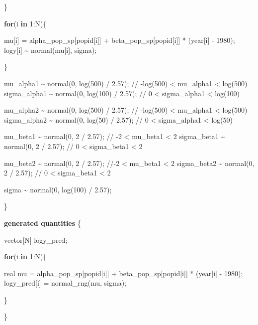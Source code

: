 \documentclass[
  letterpaper,
  DIV=11,
  numbers=noendperiod]{scrartcl}
\newenvironment{Shaded}{\begin{snugshade}}{\end{snugshade}}
\newcommand{\CommentTok}[1]{\textcolor[rgb]{0.37,0.37,0.37}{#1}}
\newcommand{\ControlFlowTok}[1]{\textcolor[rgb]{0.00,0.23,0.31}{\textbf{#1}}}
\newcommand{\DataTypeTok}[1]{\textcolor[rgb]{0.68,0.00,0.00}{#1}}
\newcommand{\DecValTok}[1]{\textcolor[rgb]{0.68,0.00,0.00}{#1}}
\newcommand{\FloatTok}[1]{\textcolor[rgb]{0.68,0.00,0.00}{#1}}
\newcommand{\KeywordTok}[1]{\textcolor[rgb]{0.00,0.23,0.31}{\textbf{#1}}}
\newcommand{\NormalTok}[1]{\textcolor[rgb]{0.00,0.23,0.31}{#1}}
\begin{document}
\begin{Shaded}
\begin{Highlighting}[]
\NormalTok{  \}}
  
  \ControlFlowTok{for}\NormalTok{(i }\ControlFlowTok{in} \DecValTok{1}\NormalTok{:N)\{}
    
\NormalTok{    mu[i] = alpha\_pop\_sp[popid[i]] + beta\_pop\_sp[popid[i]] * (year[i] {-} }\DecValTok{1980}\NormalTok{);}
\NormalTok{    logy[i] \textasciitilde{} normal(mu[i], sigma);}
    
\NormalTok{  \}}
  
\NormalTok{  mu\_alpha1 \textasciitilde{} normal(}\DecValTok{0}\NormalTok{, log(}\DecValTok{500}\NormalTok{) / }\FloatTok{2.57}\NormalTok{); }\CommentTok{// {-}log(500) \textless{} mu\_alpha1 \textless{} log(500)}
\NormalTok{  sigma\_alpha1 \textasciitilde{} normal(}\DecValTok{0}\NormalTok{, log(}\DecValTok{100}\NormalTok{) / }\FloatTok{2.57}\NormalTok{); }\CommentTok{// 0 \textless{} sigma\_alpha1 \textless{} log(100)}
  
\NormalTok{  mu\_alpha2 \textasciitilde{} normal(}\DecValTok{0}\NormalTok{, log(}\DecValTok{500}\NormalTok{) / }\FloatTok{2.57}\NormalTok{); }\CommentTok{// {-}log(500) \textless{} mu\_alpha1 \textless{} log(500)}
\NormalTok{  sigma\_alpha2 \textasciitilde{} normal(}\DecValTok{0}\NormalTok{, log(}\DecValTok{50}\NormalTok{) / }\FloatTok{2.57}\NormalTok{); }\CommentTok{// 0 \textless{} sigma\_alpha1 \textless{} log(50)}
  
\NormalTok{  mu\_beta1 \textasciitilde{} normal(}\DecValTok{0}\NormalTok{, }\DecValTok{2}\NormalTok{ / }\FloatTok{2.57}\NormalTok{); }\CommentTok{// {-}2 \textless{} mu\_beta1 \textless{} 2}
\NormalTok{  sigma\_beta1 \textasciitilde{} normal(}\DecValTok{0}\NormalTok{, }\DecValTok{2}\NormalTok{ / }\FloatTok{2.57}\NormalTok{); }\CommentTok{// 0 \textless{} sigma\_beta1 \textless{} 2}
  
\NormalTok{  mu\_beta2 \textasciitilde{} normal(}\DecValTok{0}\NormalTok{, }\DecValTok{2}\NormalTok{ / }\FloatTok{2.57}\NormalTok{); }\CommentTok{//{-}2 \textless{} mu\_beta1 \textless{} 2}
\NormalTok{  sigma\_beta2 \textasciitilde{} normal(}\DecValTok{0}\NormalTok{, }\DecValTok{2}\NormalTok{ / }\FloatTok{2.57}\NormalTok{); }\CommentTok{// 0 \textless{} sigma\_beta1 \textless{} 2}
  
\NormalTok{  sigma \textasciitilde{} normal(}\DecValTok{0}\NormalTok{, log(}\DecValTok{100}\NormalTok{) / }\FloatTok{2.57}\NormalTok{);}
  
\NormalTok{\}}

\KeywordTok{generated quantities}\NormalTok{ \{}
  
  \DataTypeTok{vector}\NormalTok{[N] logy\_pred;}
  
  \ControlFlowTok{for}\NormalTok{(i }\ControlFlowTok{in} \DecValTok{1}\NormalTok{:N)\{}
    
    \DataTypeTok{real}\NormalTok{ mu = alpha\_pop\_sp[popid[i]] }
\NormalTok{    + beta\_pop\_sp[popid[i]] * (year[i] {-} }\DecValTok{1980}\NormalTok{);}
\NormalTok{    logy\_pred[i] = normal\_rng(mu, sigma);}
    
\NormalTok{  \}}
  
\NormalTok{\}}
\end{Highlighting}
\end{Shaded}
\end{document}
